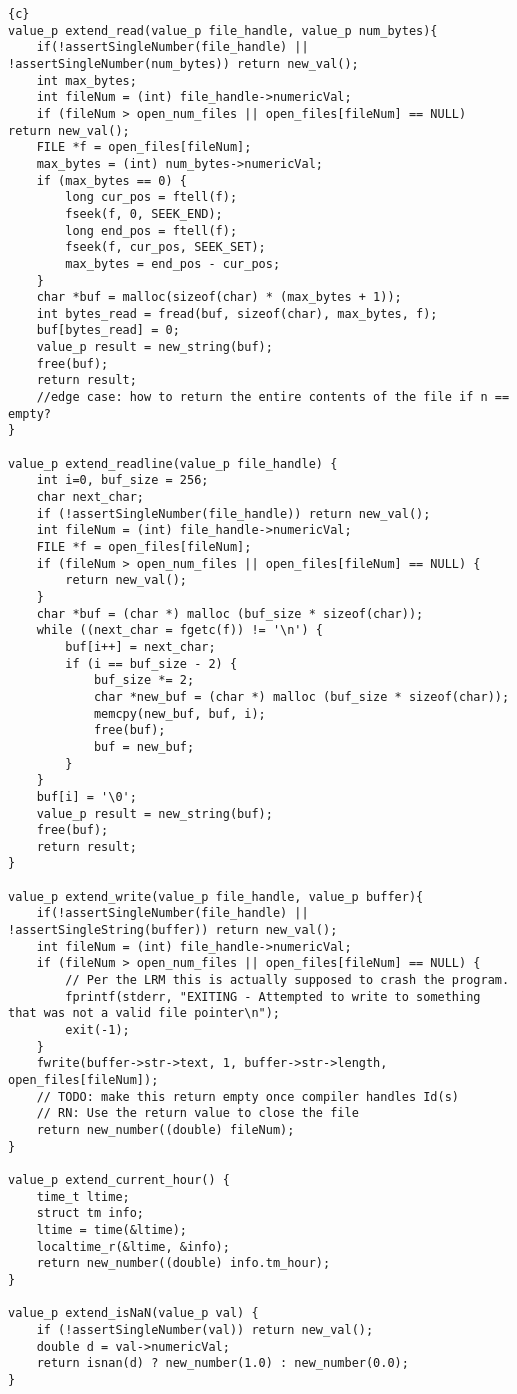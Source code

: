\begin{lstlisting}{c}
value_p extend_read(value_p file_handle, value_p num_bytes){
	if(!assertSingleNumber(file_handle) || !assertSingleNumber(num_bytes)) return new_val();
	int max_bytes;
	int fileNum = (int) file_handle->numericVal;
	if (fileNum > open_num_files || open_files[fileNum] == NULL)  return new_val();
	FILE *f = open_files[fileNum];
	max_bytes = (int) num_bytes->numericVal;
	if (max_bytes == 0) {
		long cur_pos = ftell(f);
		fseek(f, 0, SEEK_END);
		long end_pos = ftell(f);
		fseek(f, cur_pos, SEEK_SET);
		max_bytes = end_pos - cur_pos;
	}
	char *buf = malloc(sizeof(char) * (max_bytes + 1));
	int bytes_read = fread(buf, sizeof(char), max_bytes, f);
	buf[bytes_read] = 0;
	value_p result = new_string(buf);
	free(buf);
	return result;
	//edge case: how to return the entire contents of the file if n == empty?
}

value_p extend_readline(value_p file_handle) {
	int	i=0, buf_size = 256;
	char next_char;
	if (!assertSingleNumber(file_handle)) return new_val();
	int fileNum = (int) file_handle->numericVal;
	FILE *f = open_files[fileNum];
	if (fileNum > open_num_files || open_files[fileNum] == NULL) {
		return new_val();
	}
	char *buf = (char *) malloc (buf_size * sizeof(char));
	while ((next_char = fgetc(f)) != '\n') {
		buf[i++] = next_char;
		if (i == buf_size - 2) {
			buf_size *= 2;
			char *new_buf = (char *) malloc (buf_size * sizeof(char));
			memcpy(new_buf, buf, i);
			free(buf);
			buf = new_buf;
		}
	}
	buf[i] = '\0';
	value_p result = new_string(buf);
	free(buf);
	return result;
}

value_p extend_write(value_p file_handle, value_p buffer){
	if(!assertSingleNumber(file_handle) || !assertSingleString(buffer)) return new_val();
	int fileNum = (int) file_handle->numericVal;
	if (fileNum > open_num_files || open_files[fileNum] == NULL) {
		// Per the LRM this is actually supposed to crash the program.
		fprintf(stderr, "EXITING - Attempted to write to something that was not a valid file pointer\n");
		exit(-1);
	}
	fwrite(buffer->str->text, 1, buffer->str->length, open_files[fileNum]);
	// TODO: make this return empty once compiler handles Id(s)
	// RN: Use the return value to close the file
	return new_number((double) fileNum);
}

value_p extend_current_hour() {
	time_t ltime;
	struct tm info;
	ltime = time(&ltime);
	localtime_r(&ltime, &info);
	return new_number((double) info.tm_hour);
}

value_p extend_isNaN(value_p val) {
	if (!assertSingleNumber(val)) return new_val();
	double d = val->numericVal;
	return isnan(d) ? new_number(1.0) : new_number(0.0);
}


\end{lstlisting}
